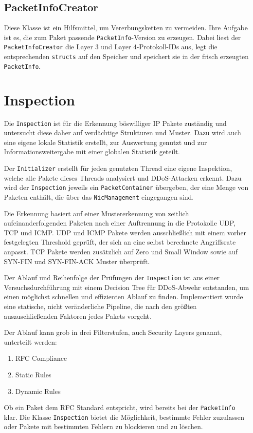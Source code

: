 \documentclass[../review_3.tex]{subfiles}
\begin{document}
\subsection{PacketInfoCreator}
Diese Klasse ist ein Hilfsmittel, um Vererbungsketten zu vermeiden. Ihre Aufgabe ist es, die zum Paket passende \texttt{PacketInfo}-Version zu erzeugen. Dabei liest der \texttt{PacketInfoCreator} die Layer 3 und Layer 4-Protokoll-IDs aus, legt die entsprechenden \texttt{structs} auf den Speicher und speichert sie in der frisch erzeugten \texttt{PacketInfo}.

\section{Inspection}
Die \texttt{Inspection} ist für die Erkennung böswilliger IP Pakete zuständig und untersucht diese daher auf verdächtige Strukturen und Muster. Dazu wird auch eine eigene lokale Statistik erstellt, zur Auswertung genutzt und zur Informationsweitergabe mit einer globalen Statistik geteilt.

Der \texttt{Initializer} erstellt für jeden genutzten Thread eine eigene Inspektion, welche alle Pakete dieses Threads analysiert und DDoS-Attacken erkennt. Dazu wird der \texttt{Inspection} jeweils ein \texttt{PacketContainer} übergeben, der eine Menge von Paketen enthält, die über das \texttt{NicManagement} eingegangen sind.

Die Erkennung basiert auf einer Mustererkennung von zeitlich aufeinanderfolgenden Paketen nach einer Auftrennung in die Protokolle UDP, TCP und ICMP. UDP und ICMP Pakete werden ausschließlich mit einem vorher festgelegten Threshold geprüft, der sich an eine selbst berechnete Angriffsrate anpasst. TCP Pakete werden zusätzlich auf Zero und Small Window sowie auf SYN-FIN und SYN-FIN-ACK Muster überprüft.

Der Ablauf und Reihenfolge der Prüfungen der \texttt{Inspection} ist aus einer Versuchsdurchführung mit einem Decision Tree für DDoS-Abwehr entstanden, um einen möglichst schnellen und effizienten Ablauf zu finden. Implementiert wurde eine statische, nicht veränderliche Pipeline, die nach den größten auszuschließenden Faktoren jedes Pakets vorgeht.

Der Ablauf kann grob in drei Filterstufen, auch Security Layers genannt, unterteilt werden:
\begin{enumerate}
    \item RFC Compliance
    \item Static Rules
    \item Dynamic Rules
\end{enumerate}
Ob ein Paket dem RFC Standard entspricht, wird bereits bei der \texttt{PacketInfo} klar. Die Klasse \texttt{Inspection} bietet die Möglichkeit, bestimmte Fehler zuzulassen oder Pakete mit bestimmten Fehlern zu blockieren und zu löschen.
\end{document}
